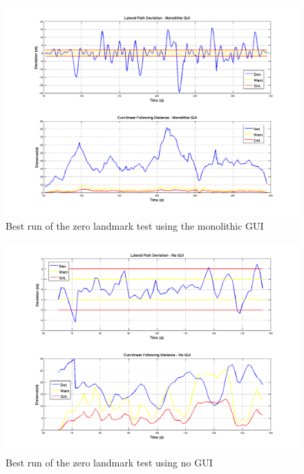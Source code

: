 \begin{figure}[ht] \centering
    \includegraphics[width=5in]{./figs/zero_landmark_results_dst_dev_monolith.png}
    \caption{Best run of the zero landmark test using the monolithic GUI} \label{fig:zeroresults_monolith}
\end{figure}

\begin{figure}[ht] \centering
    \includegraphics[width=5in]{./figs/zero_landmark_results_dst_dev_control.png}
    \caption{Best run of the zero landmark test using no GUI} \label{fig:zeroresults_control}
\end{figure}
